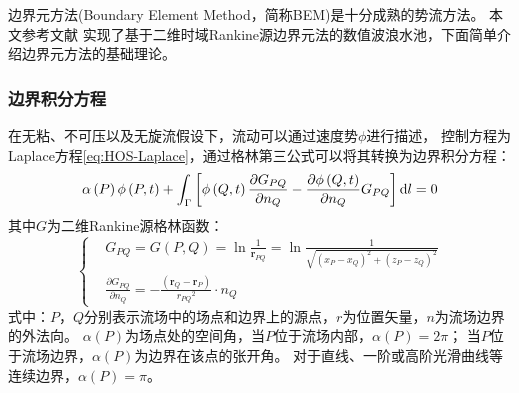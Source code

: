 边界元方法(Boundary Element Method，简称BEM)是十分成熟的势流方法。%
本文参考文献\parencite{grilliNumericalModelingWave1996,SunErWeiZiYouMianTiaoJianHeFuSheTiaoJianDeShuZhiMoNi2004}%
实现了基于二维时域Rankine源边界元法的数值波浪水池，下面简单介绍边界元方法的基础理论。

\subsubsection{
  \texorpdfstring{边界积分方程} %
  {\thesubsubsection 边界积分方程} %
}
\label{sssec:边界积分方程}

在无粘、不可压以及无旋流假设下，流动可以通过速度势$\phi$进行描述，%
控制方程为Laplace方程\cref{eq:HOS-Laplace}，通过格林第三公式可以将其转换为边界积分方程：
\begin{equation}
  \alpha\left(P\right) \phi\left(P,t\right) %
  + \int_{\Gamma} \left[\phi\left(Q,t\right) \frac{\partial G_{PQ}}{\partial n_Q} %
  - \frac{\partial \phi\left(Q,t\right)}{\partial n_Q}G_{PQ}\right] {\rm{d}} l = 0
  \label{eq:BEM-BIE}
\end{equation}
其中$G$为二维Rankine源格林函数：
\begin{equation}
  \left\{
    \begin{aligned}
      & G_{PQ} = G\left(P,Q\right) = \ln\frac{1}{\bm{r}_{PQ}} %
      = \ln \frac{1}{\sqrt{\left(x_P - x_Q\right)^2 + \left(z_P - z_Q\right)^2}} \\
      & \frac{\partial G_{PQ}}{\partial n_Q} = -\frac{\left(\bm{r}_Q - \bm{r}_P\right)}{{r_{PQ}}^2} \cdot n_Q
    \end{aligned}
  \right.
\end{equation}
式中：$P$，$Q$分别表示流场中的场点和边界上的源点，$r$为位置矢量，$n$为流场边界的外法向。%
$\alpha\left(P\right)$为场点处的空间角，当$P$位于流场内部，$\alpha\left(P\right) = 2\pi$；%
当$P$位于流场边界，$\alpha\left(P\right)$为边界在该点的张开角。%
对于直线、一阶或高阶光滑曲线等连续边界，$\alpha\left(P\right) = \pi$。

